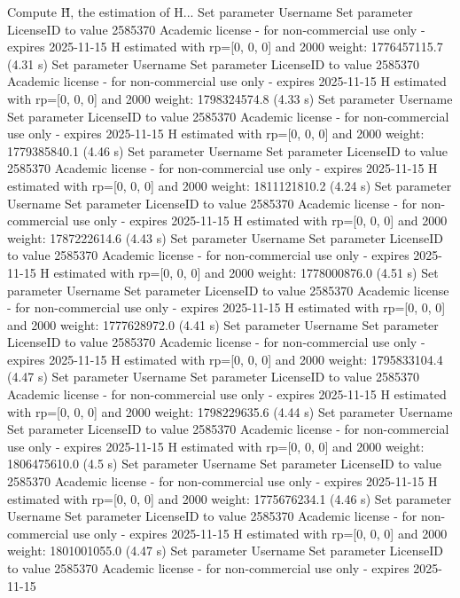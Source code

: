 Compute H̃, the estimation of H...
Set parameter Username
Set parameter LicenseID to value 2585370
Academic license - for non-commercial use only - expires 2025-11-15
  H estimated with rp=[0, 0, 0] and 2000 weight:  1776457115.7  (4.31 s)
Set parameter Username
Set parameter LicenseID to value 2585370
Academic license - for non-commercial use only - expires 2025-11-15
  H estimated with rp=[0, 0, 0] and 2000 weight:  1798324574.8  (4.33 s)
Set parameter Username
Set parameter LicenseID to value 2585370
Academic license - for non-commercial use only - expires 2025-11-15
  H estimated with rp=[0, 0, 0] and 2000 weight:  1779385840.1  (4.46 s)
Set parameter Username
Set parameter LicenseID to value 2585370
Academic license - for non-commercial use only - expires 2025-11-15
  H estimated with rp=[0, 0, 0] and 2000 weight:  1811121810.2  (4.24 s)
Set parameter Username
Set parameter LicenseID to value 2585370
Academic license - for non-commercial use only - expires 2025-11-15
  H estimated with rp=[0, 0, 0] and 2000 weight:  1787222614.6  (4.43 s)
Set parameter Username
Set parameter LicenseID to value 2585370
Academic license - for non-commercial use only - expires 2025-11-15
  H estimated with rp=[0, 0, 0] and 2000 weight:  1778000876.0  (4.51 s)
Set parameter Username
Set parameter LicenseID to value 2585370
Academic license - for non-commercial use only - expires 2025-11-15
  H estimated with rp=[0, 0, 0] and 2000 weight:  1777628972.0  (4.41 s)
Set parameter Username
Set parameter LicenseID to value 2585370
Academic license - for non-commercial use only - expires 2025-11-15
  H estimated with rp=[0, 0, 0] and 2000 weight:  1795833104.4  (4.47 s)
Set parameter Username
Set parameter LicenseID to value 2585370
Academic license - for non-commercial use only - expires 2025-11-15
  H estimated with rp=[0, 0, 0] and 2000 weight:  1798229635.6  (4.44 s)
Set parameter Username
Set parameter LicenseID to value 2585370
Academic license - for non-commercial use only - expires 2025-11-15
  H estimated with rp=[0, 0, 0] and 2000 weight:  1806475610.0  (4.5 s)
Set parameter Username
Set parameter LicenseID to value 2585370
Academic license - for non-commercial use only - expires 2025-11-15
  H estimated with rp=[0, 0, 0] and 2000 weight:  1775676234.1  (4.46 s)
Set parameter Username
Set parameter LicenseID to value 2585370
Academic license - for non-commercial use only - expires 2025-11-15
  H estimated with rp=[0, 0, 0] and 2000 weight:  1801001055.0  (4.47 s)
Set parameter Username
Set parameter LicenseID to value 2585370
Academic license - for non-commercial use only - expires 2025-11-15
